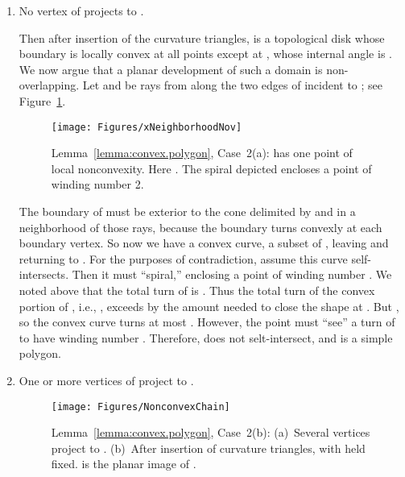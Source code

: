 \pdfoutput=1  \documentclass[]{article}
\newcommand{\hide}[1]{}
\newcommand{\ABox}{
\raisebox{3pt}{\framebox[6pt]{\rule{6pt}{0pt}}}
}
\newenvironment{proof}{{\bf Proof:}}{\hfill\ABox}
\newcommand{\figlab}[1]{\label{fig:#1}}
\newcommand{\lemref}[1]{\ref{lemma:#1}}
\newcommand{\figref}[1]{\ref{fig:#1}}
\begin{document}
\begin{proof}
\begin{enumerate}
\begin{enumerate}
\item No vertex of  projects to .

Then after insertion of the curvature triangles,  is a topological
disk whose boundary is locally convex at all points except at ,
whose internal angle is .
We now argue that a planar development of such a domain is non-overlapping.
Let  and  be rays from  along the two edges of 
incident to ;
see Figure~\figref{xNeighborhoodNov}.
\begin{figure}[htbp]
\centering
\texttt{[image: Figures/xNeighborhoodNov]}
\caption{Lemma~\protect\lemref{convex.polygon}, Case~2(a): 
 has one point  of local nonconvexity.
Here .
The spiral depicted encloses a point  of winding number 2.
}
\figlab{xNeighborhoodNov}
\end{figure}
The boundary  of  must be exterior to the cone
delimited by  and  in a neighborhood of those rays,
because the boundary turns convexly at each boundary vertex.
So now we have a convex curve, a subset of ,
leaving  and returning to .
For the purposes of contradiction, assume this curve self-intersects.
Then it must ``spiral,'' enclosing a point  of winding number .
We noted above that the total turn of  is .
Thus the total turn of
the convex portion of , i.e.,
,
exceeds  by the amount  needed
to close the shape at .  
But , so
the convex curve
turns at most .
However, the point  must ``see'' a turn of  to have
winding number .
Therefore,   does not selt-intersect,
and   is a simple polygon.

\item One or more vertices of  project to .

\hide{
\begin{figure}[htbp]
\centering
\texttt{[image: Figures/quasicones]}
\caption{Lemma~\protect\lemref{convex.polygon}, Case~2(b): 
(a)~Several vertices project to . (b,c,d)~Insertion of curvature triangles. Here
 for .
}
\figlab{quasicones}
\end{figure}
}\begin{figure}[htbp]
\centering
\texttt{[image: Figures/NonconvexChain]}
\caption{Lemma~\protect\lemref{convex.polygon}, Case~2(b): 
(a)~Several vertices project to .
(b)~After insertion of curvature triangles, with  held fixed.  is the
planar image of .
}
\figlab{NonconvexChain}
\end{figure}



\end{enumerate}
\end{enumerate}
\end{proof}
\end{document}

